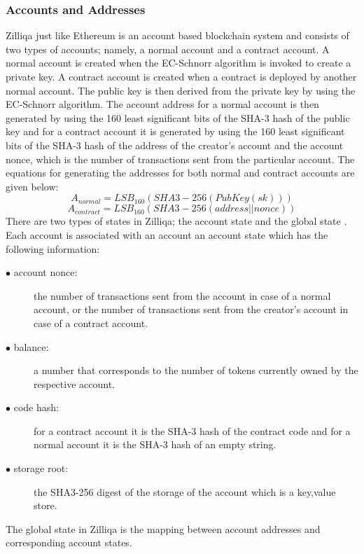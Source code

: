 \documentclass[a4paper,twoside,phd]{BYUPhys}
\begin{document}
\subsubsection{Accounts and Addresses}
Zilliqa just like Ethereum is an account based blockchain system and consists of two types of accounts; namely, a normal account and a contract account. A normal account is created when the EC-Schnorr algorithm is invoked to create a private key. A contract account is created when a contract is deployed by another normal account. The public key is then derived from the private key by using the EC-Schnorr algorithm. The account address for a normal account is then generated by using the 160 least significant bits of the SHA-3 hash of the public key and for a contract account it is generated by using the 160 least significant bits of the SHA-3 hash of the address of the creator's account and the account nonce, which is the number of transactions sent from the particular account\cite{}. The equations for generating the addresses for both normal and contract accounts are given below\cite{}:
\begin{equation}
    A_{normal} = LSB_{160}(SHA3-256(PubKey(sk)))
\end{equation}
\begin{equation}
    A_{contract} = LSB_{160}(SHA3-256(address||nonce))
\end{equation}
There are two types of states in Zilliqa; the account state and the global state \cite{}.
Each account is associated with an account an account state which has the following information\cite{}:
\begin{description}
\item[$\bullet$ account nonce:] the number of transactions sent from the account in case of a normal account, or the number of transactions sent from the creator's account in case of a contract account.
\item[$\bullet$ balance:] a number that corresponds to the number of tokens currently owned by the respective account.
\item[$\bullet$ code hash:] for a contract account it is the SHA-3 hash of the contract code and for a normal account it is the SHA-3 hash of an empty string.
\item[$\bullet$ storage root:] the SHA3-256 digest of the storage of the account which is a key,value store.
\end{description}
The global state in Zilliqa is the mapping between account addresses and corresponding account states. 
\end{document}

